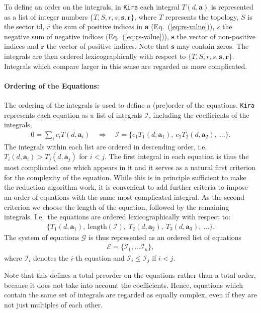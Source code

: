 \documentclass[a4paper,12pt]{scrartcl}
\newcommand*{\bm}{\boldsymbol}
\newcommand*{\kira}{\texttt{Kira}}
\newcommand*{\CE}{\mathcal{E}}
\newcommand*{\CG}{\mathcal{G}}
\newcommand*{\CI}{\mathcal{I}}
\def\Eq#1{{Eq.~(\ref{#1})}}
\begin{document}
To define an order on the integrals, in \kira{} each integral $T(d,\bm{a})$ is
represented as a list of integer numbers $\{T,S,r,s,\bm{s},\bm{r}\}$, where $T$
represents the topology, $S$ is the sector id, $r$ the sum of positive indices
in $\bm{a}$ (\Eq{eq:rs-value}), $s$ the negative sum of negative indices
(\Eq{eq:rs-value}), $\bm{s}$ the vector of non-positive indices
and $\bm{r}$ the vector of positive indices. Note that $\bm{s}$ may contain zeros. The integrals
are then ordered lexicographically with respect to $\{T,S,r,s,\bm{s},\bm{r}\}$. Integrals
which compare larger in this sense are regarded as more complicated.

\paragraph{Ordering of the Equations:}

The ordering of the integrals is used to define a (pre)order of the equations.
\kira{} represents each equation as a list of integrals $\CI$, including the
coefficients of the integrals,
\begin{align}
  0 = \sum_i c_i T(d,\bm{a}_i)
  \quad\Rightarrow\quad
  \CI = \{c_1 T_1(d,\bm{a}_1),~c_2 T_2(d,\bm{a}_{2}),~\ldots\}.
\end{align}
The integrals within each list are ordered in descending order,
i.e.\ $T_i(d,\bm{a}_i)>T_j(d,\bm{a}_j)$ for $i<j$. The first integral in each
equation is thus the most complicated one which appears in it and it serves as a
natural first criterion for the complexity of the equation. While this is in
principle sufficient to make the reduction algorithm work, it is convenient to
add further criteria to impose an order of equations with the same most
complicated integral. As the second criterion we choose the length of the
equation, followed by the remaining integrals. I.e.\ the equations are ordered
lexicographically with respect to:
\begin{align}
  \{T_1(d,\bm{a}_1),~\mathrm{length}(\CI),~T_2(d,\bm{a}_2),~T_3(d,\bm{a}_3),~\ldots\}.
\end{align}
The system of equations $\CG$ is thus represented as an ordered list of
equations
\begin{align}
  \CE = \{\CI_1,\dots \CI_n\},
  \label{listofequations}
\end{align}
where $\CI_i$ denotes the $i$-th equation and $\CI_i\le\CI_j$ if $i<j$.

Note that this defines a total preorder on the equations rather than a total
order, because it does not take into account the coefficients. Hence, equations
which contain the same set of integrals are regarded as equally complex, even if
they are not just multiples of each other.
\end{document}
